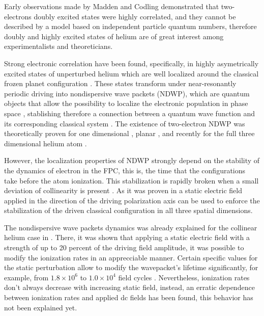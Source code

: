 Early observations made by Madden and Codling \cite{PhysRevLett.10.516} demonstrated that two-electrons doubly excited states were highly correlated, and they cannot be described by a model based on independent particle quantum numbers, therefore doubly and highly excited states of helium are of great interest among experimentalists and theoreticians. 

Strong electronic correlation have been found, specifically, in highly asymetrically excited states of unperturbed helium which are well localized around the classical frozen planet configuration \cite{richter1990stable,richter1992novel}. These states transform under near-resonantly periodic driving into nondispersive wave packets (NDWP), which are quantum objects that allow the possibility to localize the electronic population in phase space \cite{weinacht1999controlling,chen1998observation}, stablishing therefore a connection between a quantum wave function and its corresponding classical system \cite{schrodinger1926stetige}. The existence of two-electron NDWP was theoretically proven for one dimensional \cite{BUCHLEITNER2002409,schlagheck1999nondispersive}, planar \cite{thesisjavier,Madronero,PhysRevA.101.013414}, and recently for the full three dimensional helium atom \cite{thesisalejo}.     

However, the localization properties of NDWP strongly depend on the stability of the dynamics of electron in the FPC, this is, the time that the configurations take before the atom ionization. This stabilization is rapidly broken when a small deviation of collinearity is present \cite{Schlagheck2003}. As it was proven  in \cite{schlagheck1998classical} a static electric field applied in the direction of the driving polarization axis can be used to enforce the stabilization of the driven classical configuration in all three spatial dimensions.

The nondispersive wave packets dynamics was already explained for the collinear helium case in \cite{schlagheck1998classical}. There, it was shown that applying a static electric field with a strength of up to 20 percent of the driving field amplitude, it was possible to modify the ionization rates in an apprecciable manner. Certain specific values for the static perturbation allow to modify the wavepacket's lifetime significantly, for example, from $ 1.8 \times 10^{6} $ to $ 1.0 \times  10^{4} $ field cycles . Nevertheless, ionization rates  don't always decrease with increasing static field, instead, an erratic dependence between ionization rates and applied dc fields has been found, this behavior has not been explained yet.

